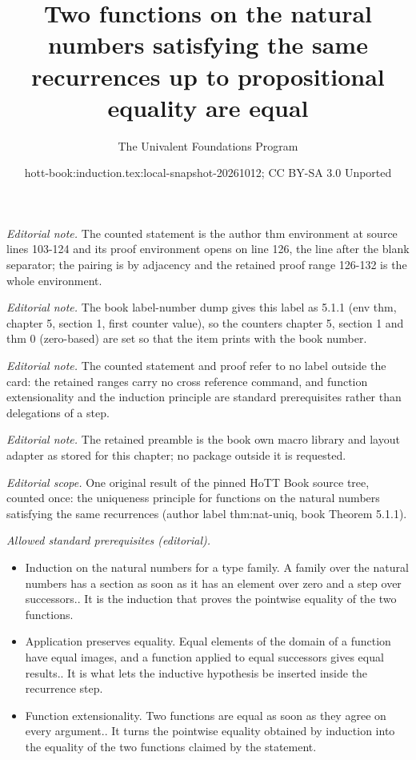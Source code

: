 \documentclass[10pt,a4paper]{article}
\title{Two functions on the natural numbers satisfying the same recurrences up to propositional equality are equal}
\author{The Univalent Foundations Program}
\date{hott-book:induction.tex:local-snapshot-20261012; CC BY-SA 3.0 Unported}
\newcounter{chapter}
\theoremstyle{definition}
\theoremstyle{remark}
\numberwithin{equation}{section}
\begin{document}
\maketitle
\setcounter{chapter}{5}
\setcounter{section}{1}
\setcounter{thm}{0}
\noindent\textit{Editorial note.} The counted statement is the author thm environment at source lines 103-124 and its proof environment opens on line 126, the line after the blank separator; the pairing is by adjacency and the retained proof range 126-132 is the whole environment.\par\medskip
\noindent\textit{Editorial note.} The book label-number dump gives this label as 5.1.1 (env thm, chapter 5, section 1, first counter value), so the counters chapter 5, section 1 and thm 0 (zero-based) are set so that the item prints with the book number.\par\medskip
\noindent\textit{Editorial note.} The counted statement and proof refer to no label outside the card: the retained ranges carry no cross reference command, and function extensionality and the induction principle are standard prerequisites rather than delegations of a step.\par\medskip
\noindent\textit{Editorial note.} The retained preamble is the book own macro library and layout adapter as stored for this chapter; no package outside it is requested.\par\medskip
\noindent\textit{Editorial scope.} One original result of the pinned HoTT Book source tree, counted once: the uniqueness principle for functions on the natural numbers satisfying the same recurrences (author label thm:nat-uniq, book Theorem 5.1.1).\par\medskip
\noindent\textit{Allowed standard prerequisites (editorial).}\begin{itemize}
\item Induction on the natural numbers for a type family. A family over the natural numbers has a section as soon as it has an element over zero and a step over successors.. It is the induction that proves the pointwise equality of the two functions.
\item Application preserves equality. Equal elements of the domain of a function have equal images, and a function applied to equal successors gives equal results.. It is what lets the inductive hypothesis be inserted inside the recurrence step.
\item Function extensionality. Two functions are equal as soon as they agree on every argument.. It turns the pointwise equality obtained by induction into the equality of the two functions claimed by the statement.
\end{itemize}\medskip
\end{document}
